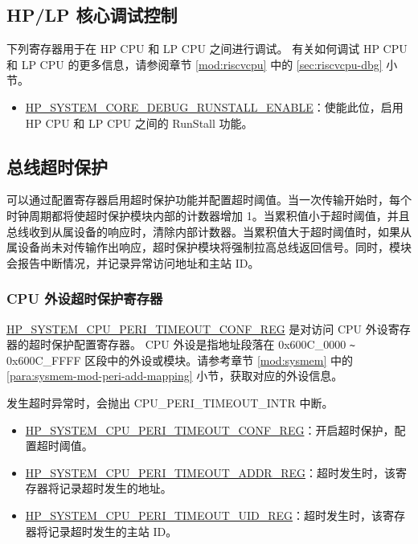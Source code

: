 \documentclass[main\_\_CN.tex]{subfiles}
\begin{document}
\subsection{HP/LP 核心调试控制}

下列寄存器用于在 HP CPU 和 LP CPU 之间进行调试。
有关如何调试 HP CPU 和 LP CPU 的更多信息，请参阅章节 \ref{mod:riscvcpu} \textit{} 中的 \ref{sec:riscvcpu-dbg}\textit{} 小节。

\begin{itemize}
    \item \hyperref[fielddesc:HPSYSTEMCOREDEBUGRUNSTALLENABLE]{HP\_SYSTEM\_CORE\_DEBUG\_RUNSTALL\_ENABLE}：使能此位，启用 HP CPU 和 LP CPU 之间的 RunStall 功能。
\end{itemize}


\subsection{总线超时保护}

\chipname{} 可以通过配置寄存器启用超时保护功能并配置超时阈值。当一次传输开始时，每个时钟周期都将使超时保护模块内部的计数器增加 1。当累积值小于超时阈值，并且总线收到从属设备的响应时，清除内部计数器。当累积值大于超时阈值时，如果从属设备尚未对传输作出响应，超时保护模块将强制拉高总线返回信号。同时，模块会报告中断情况，并记录异常访问地址和主站 ID。

\subsubsection{CPU 外设超时保护寄存器}

\hyperref[regdesc:HPSYSTEMCPUPERITIMEOUTCONFREG]{HP\_SYSTEM\_CPU\_PERI\_TIMEOUT\_CONF\_REG} 是对访问 CPU 外设寄存器的超时保护配置寄存器。
CPU 外设是指地址段落在 0x600C\_0000 \verb+~+ 0x600C\_FFFF 区段中的外设或模块。请参考章节 \ref{mod:sysmem} \textit{} 中的 \ref{para:sysmem-mod-peri-add-mapping} \textit{} 小节，获取对应的外设信息。

发生超时异常时，会抛出 CPU\_PERI\_TIMEOUT\_INTR 中断。

\begin{itemize}
    \item \hyperref[regdesc:HPSYSTEMCPUPERITIMEOUTCONFREG]{HP\_SYSTEM\_CPU\_PERI\_TIMEOUT\_CONF\_REG}：开启超时保护，配置超时阈值。
    \item \hyperref[regdesc:HPSYSTEMCPUPERITIMEOUTADDRREG]{HP\_SYSTEM\_CPU\_PERI\_TIMEOUT\_ADDR\_REG}：超时发生时，该寄存器将记录超时发生的地址。
    \item \hyperref[regdesc:HPSYSTEMCPUPERITIMEOUTUIDREG]{HP\_SYSTEM\_CPU\_PERI\_TIMEOUT\_UID\_REG}：超时发生时，该寄存器将记录超时发生的主站 ID。
\end{itemize}
\end{document}
